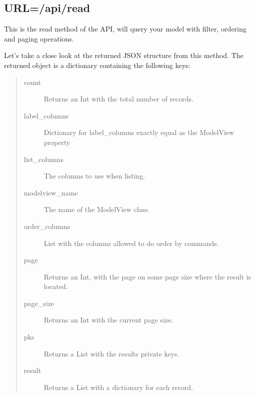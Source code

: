 \documentclass[letterpaper,10pt,english]{sphinxmanual}
\begin{document}
\subsection{URL=/api/read}
\label{quickhowto:url-api-read}
This is the read method of the API, will query your model with filter, ordering and paging operations.

Let's take a close look at the returned JSON structure from this method. The returned object is a dictionary containing
the following keys:
\begin{quote}\begin{description}
\item[{count}] \leavevmode
Returns an Int with the total number of records.

\item[{label\_columns}] \leavevmode
Dictionary for label\_columns exactly equal as the ModelView property

\item[{list\_columns}] \leavevmode
The columns to use when listing.

\item[{modelview\_name}] \leavevmode
The name of the ModelView class.

\item[{order\_columns}] \leavevmode
List with the columns allowed to do order by commands.

\item[{page}] \leavevmode
Returns an Int, with the page on some page size where the result is located.

\item[{page\_size}] \leavevmode
Returns an Int with the current page size.

\item[{pks}] \leavevmode
Returns a List with the results private keys.

\item[{result}] \leavevmode
Returns a List with a dictionary for each record.

\end{description}\end{quote}
\end{document}
